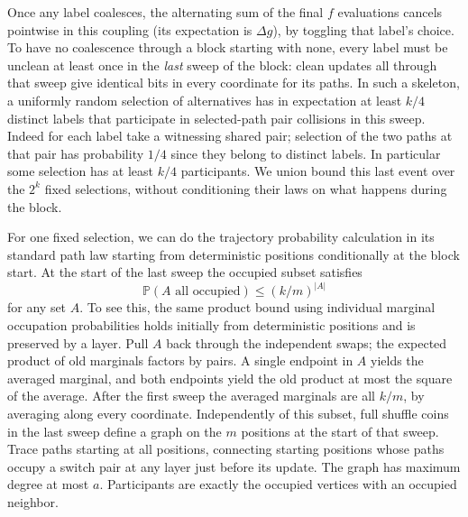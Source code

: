 Once any label coalesces, the alternating sum of the final \(f\) evaluations cancels pointwise in this coupling (its expectation is \(\Delta g\)), by toggling that label's choice. To have no coalescence through a block starting with none, every label must be unclean at least once in the \emph{last} sweep of the block: clean updates all through that sweep give identical bits in every coordinate for its paths. In such a skeleton, a uniformly random selection of alternatives has in expectation at least \(k/4\) distinct labels that participate in selected-path pair collisions in this sweep. Indeed for each label take a witnessing shared pair; selection of the two paths at that pair has probability \(1/4\) since they belong to distinct labels. In particular some selection has at least \(k/4\) participants. We union bound this last event over the \(2^k\) fixed selections, without conditioning their laws on what happens during the block.

For one fixed selection, we can do the trajectory probability calculation in its standard path law starting from deterministic positions conditionally at the block start. At the start of the last sweep the occupied subset satisfies
\[
 \mathbb P(A\text{ all occupied})\le (k/m)^{|A|}
\]
for any set \(A\). To see this, the same product bound using individual marginal occupation probabilities holds initially from deterministic positions and is preserved by a layer. Pull \(A\) back through the independent swaps; the expected product of old marginals factors by pairs. A single endpoint in \(A\) yields the averaged marginal, and both endpoints yield the old product at most the square of the average. After the first sweep the averaged marginals are all \(k/m\), by averaging along every coordinate. Independently of this subset, full shuffle coins in the last sweep define a graph on the \(m\) positions at the start of that sweep. Trace paths starting at all positions, connecting starting positions whose paths occupy a switch pair at any layer just before its update. The graph has maximum degree at most \(a\). Participants are exactly the occupied vertices with an occupied neighbor.

